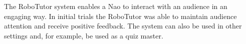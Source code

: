 The RoboTutor system enables a Nao to interact with an audience in an engaging way. In initial trials the RoboTutor was able to maintain audience attention and receive positive feedback. The system can also be used in other settings and, for example, be used as a quiz master.

